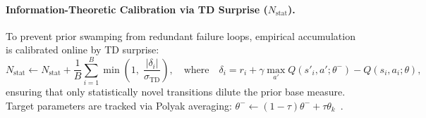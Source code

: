 \documentclass[10pt]{article}
\begin{document}
\paragraph{Information-Theoretic Calibration via TD Surprise (\texorpdfstring{$N_{\text{stat}}$}{N\_stat}).}
To prevent prior swamping from redundant failure loops, empirical accumulation is calibrated online by TD surprise:
\begin{equation}
\label{eq:n_stat_update}
N_{\text{stat}} \leftarrow N_{\text{stat}} + \frac{1}{B} \sum_{i=1}^B \min\left(1, \; \frac{|\delta_i|}{\sigma_{\text{TD}}}\right), \quad \text{where} \quad \delta_i = r_i + \gamma \max_{a'} Q(s'_i, a'; \theta^-) - Q(s_i, a_i; \theta),
\end{equation}
ensuring that only statistically novel transitions dilute the prior base measure. Target parameters are tracked via Polyak averaging: $\theta^- \leftarrow (1 - \tau) \theta^- + \tau \theta_k$~\citep{lillicrap2015continuous, mnih2015human}.
\end{document}
